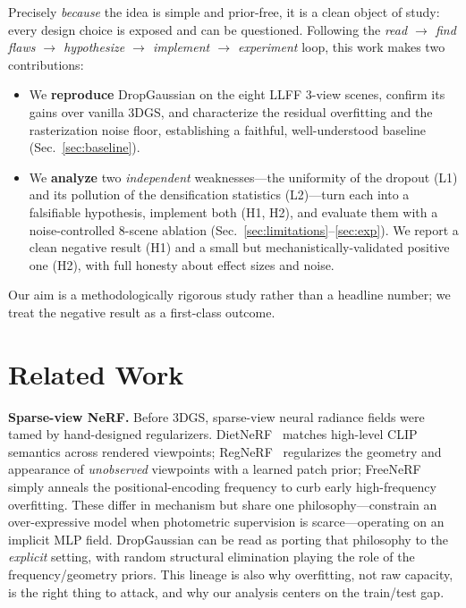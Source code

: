 \documentclass[conference]{IEEEtran}
\begin{document}
Precisely \emph{because} the idea is simple and prior-free, it is a clean object of
study: every design choice is exposed and can be questioned. Following the
\emph{read $\rightarrow$ find flaws $\rightarrow$ hypothesize $\rightarrow$ implement
$\rightarrow$ experiment} loop, this work makes two contributions:
\begin{itemize}
\item We \textbf{reproduce} DropGaussian on the eight LLFF 3-view scenes, confirm its
gains over vanilla 3DGS, and characterize the residual overfitting and the
rasterization noise floor, establishing a faithful, well-understood baseline
(Sec.~\ref{sec:baseline}).
\item We \textbf{analyze} two \emph{independent} weaknesses---the uniformity of the
dropout (L1) and its pollution of the densification statistics (L2)---turn each into a
falsifiable hypothesis, implement both (H1, H2), and evaluate them with a
noise-controlled 8-scene ablation (Sec.~\ref{sec:limitations}--\ref{sec:exp}). We
report a clean negative result (H1) and a small but mechanistically-validated positive
one (H2), with full honesty about effect sizes and noise.
\end{itemize}
Our aim is a methodologically rigorous study rather than a headline number; we treat
the negative result as a first-class outcome.

\section{Related Work}
\textbf{Sparse-view NeRF.} Before 3DGS, sparse-view neural radiance fields were tamed
by hand-designed regularizers. DietNeRF~\cite{jain2021dietnerf} matches high-level CLIP
semantics across rendered viewpoints; RegNeRF~\cite{niemeyer2022regnerf} regularizes the
geometry and appearance of \emph{unobserved} viewpoints with a learned patch prior;
FreeNeRF~\cite{yang2023freenerf} simply anneals the positional-encoding frequency to
curb early high-frequency overfitting. These differ in mechanism but share one
philosophy---constrain an over-expressive model when photometric supervision is
scarce---operating on an implicit MLP field. DropGaussian can be read as porting that
philosophy to the \emph{explicit} setting, with random structural elimination playing
the role of the frequency/geometry priors. This lineage is also why overfitting, not
raw capacity, is the right thing to attack, and why our analysis centers on the
train/test gap.
\end{document}
